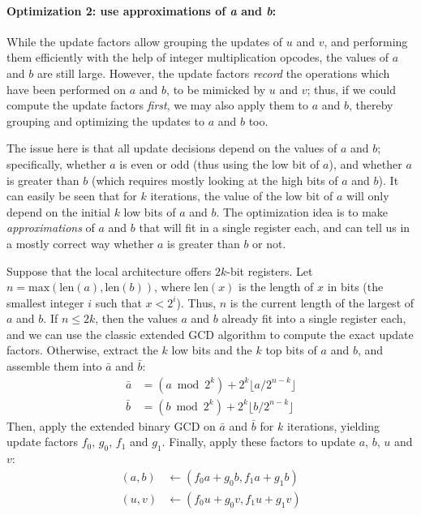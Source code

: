 \documentclass{llncs}
\newcommand{\bitlength}{\text{len}}
\begin{document}
\paragraph{Optimization 2: use approximations of \emph{a} and \emph{b}:}

While the update factors allow grouping the updates of $u$ and $v$, and
performing them efficiently with the help of integer multiplication
opcodes, the values of $a$ and $b$ are still large. However, the update
factors \emph{record} the operations which have been performed on $a$
and $b$, to be mimicked by $u$ and $v$; thus, if we could compute the
update factors \emph{first}, we may also apply them to $a$ and $b$,
thereby grouping and optimizing the updates to $a$ and $b$ too.

The issue here is that all update decisions depend on the values of $a$
and $b$; specifically, whether $a$ is even or odd (thus using the low
bit of $a$), and whether $a$ is greater than $b$ (which requires mostly
looking at the high bits of $a$ and $b$). It can easily be seen that for
$k$ iterations, the value of the low bit of $a$ will only depend on the
initial $k$ low bits of $a$ and $b$. The optimization idea is to make
\emph{approximations} of $a$ and $b$ that will fit in a single register
each, and can tell us in a mostly correct way whether $a$ is greater
than $b$ or not.

Suppose that the local architecture offers $2k$-bit registers. Let
$n = \text{max}(\bitlength(a), \bitlength(b))$, where $\bitlength(x)$ is
the length of $x$ in bits (the smallest integer $i$ such that
$x < 2^i$). Thus, $n$ is the current length of the largest of $a$ and $b$.
If $n \leq 2k$, then the values $a$ and $b$ already fit into a single
register each, and we can use the classic extended GCD algorithm to
compute the exact update factors. Otherwise, extract the $k$ low bits
and the $k$ top bits of $a$ and $b$, and assemble them into $\bar a$ and
$\bar b$:
\begin{align*}
    \bar a &= (a \bmod 2^k) + 2^k \lfloor a / 2^{n-k} \rfloor \\
    \bar b &= (b \bmod 2^k) + 2^k \lfloor b / 2^{n-k} \rfloor
\end{align*}
Then, apply the extended binary GCD on $\bar a$ and $\bar b$ for $k$
iterations, yielding update factors $f_0$, $g_0$, $f_1$ and $g_1$.
Finally, apply these factors to update $a$, $b$, $u$ and $v$:
\begin{align*}
    (a, b) &\leftarrow (f_0 a + g_0 b, f_1 a + g_1 b) \\
    (u, v) &\leftarrow (f_0 u + g_0 v, f_1 u + g_1 v)
\end{align*}
\end{document}
